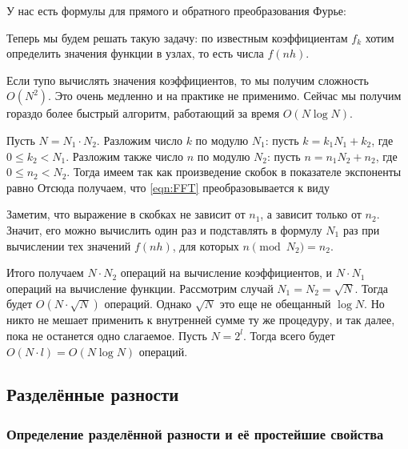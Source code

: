 \documentclass[a4paper]{article}
\begin{document}
У нас есть формулы для прямого и обратного преобразования Фурье:


Теперь мы будем решать такую задачу: по известным коэффициентам $f_k$
хотим определить значения функции в узлах, то есть числа $f(nh)$.


Если тупо вычислять значения коэффициентов, то мы получим сложность
$O(N^2)$. Это очень медленно и на практике не применимо. Сейчас мы
получим гораздо более быстрый алгоритм, работающий за время $O(N\log
N)$.

Пусть $N=N_1\cdot N_2$. Разложим число $k$ по модулю $N_1$: пусть $k =
k_1N_1 + k_2$, где $0\le k_2 < N_1$.  Разложим также число $n$ по
модулю $N_2$: пусть $n = n_1 N_2 + n_2$, где $0\le n_2 < N_2$.  Тогда
имеем  так как произведение скобок в
показателе экспоненты равно   Отсюда получаем, что \eqref{eqn:FFT}
преобразовывается к виду

Заметим, что выражение в скобках не зависит от $n_1$, а зависит только
от $n_2$. Значит, его можно вычислить один раз и подставлять в формулу
$N_1$ раз при вычислении тех значений $f(nh)$, для которых $n
\pmod{N_2} = n_2$.

Итого получаем $N \cdot N_2$ операций на вычисление коэффициентов, и
$N\cdot N_1$ операций на вычисление функции.  Рассмотрим случай $N_1 =
N_2 = \sqrt N$. Тогда будет $O(N\cdot \sqrt N)$ операций.  Однако
$\sqrt N$ это еще не обещанный $\log N$. Но никто не мешает применить
к внутренней сумме ту же процедуру, и так далее, пока не останется
одно слагаемое.  Пусть $N = 2^l$. Тогда всего будет $O(N\cdot l) = O(N
\log N)$ операций.

\subsection{Разделённые разности}

\subsubsection{Определение разделённой разности и её простейшие свойства}
\end{document}
